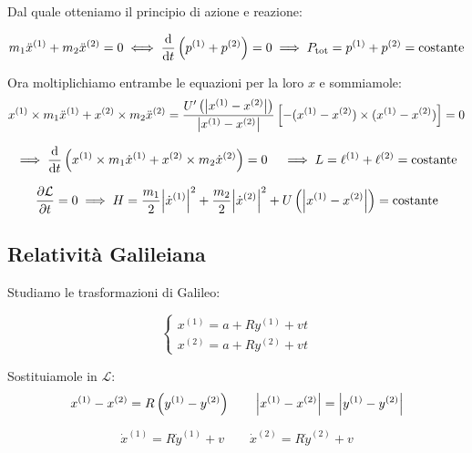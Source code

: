 Dal quale otteniamo il principio di azione e reazione:

\begin{equation}
    m_1 \ddot{x}^{(1)} + m_2 \ddot{x}^{(2)} = 0 
    \iff \dv{t}\left( p^{(1)} + p^{(2)} \right)=0 
    \implies P_{\text{tot}}=p^{(1)}+p^{(2)}=\text{costante}
\end{equation}

Ora moltiplichiamo entrambe le equazioni per la loro $x$ e sommiamole:
\begin{equation}
    x^{(1)}\times m_1 \ddot{x}^{(1)} + x^{(2)}\times m_2 \ddot{x}^{(2)} 
    =\frac{U'\left(\abs{x^{(1)}-x^{(2)}}\right)}{\abs{x^{(1)}-x^{(2)}}}
    \left[ -(x^{(1)}-x^{(2)})\times (x^{(1)}-x^{(2)}) \right]=0
\end{equation}

\begin{equation}
    \implies \dv{t}\left( x^{(1)}\times m_1 \dot{x}^{(1)} + x^{(2)}\times m_2 \dot{x}^{(2)} \right)=0
    \quad \implies L=\ell^{(1)}+\ell^{(2)}=\text{costante}
\end{equation}

\begin{equation}
    \pdv{\mathcal{L}}{t}=0 \implies H=\frac{m_1}{2}\abs{\dot{x}^{(1)}}^2 + \frac{m_2}{2}\abs{\dot{x}^{(2)}}^2 + U\left(\abs{x^{(1)}-x^{(2)}}\right)=\text{costante}
\end{equation}



\subsection{Relatività Galileiana}
Studiamo le trasformazioni di Galileo:

\begin{equation}
    \begin{cases}
        x^{(1)} = a + R y^{(1)} + v t \\
        x^{(2)} = a + R y^{(2)} + v t
    \end{cases}
\end{equation}

Sostituiamole in $\mathcal{L}$:
\begin{equation}
    x^{(1)} - x^{(2)} = R \left( y^{(1)} - y^{(2)} \right)
    \qquad \abs{x^{(1)} - x^{(2)}} = \abs{y^{(1)} - y^{(2)}}
\end{equation}

\begin{equation}
    \dot{x}^{(1)} = R \dot{y}^{(1)} + v \qquad 
    \dot{x}^{(2)} = R \dot{y}^{(2)} + v
\end{equation}

